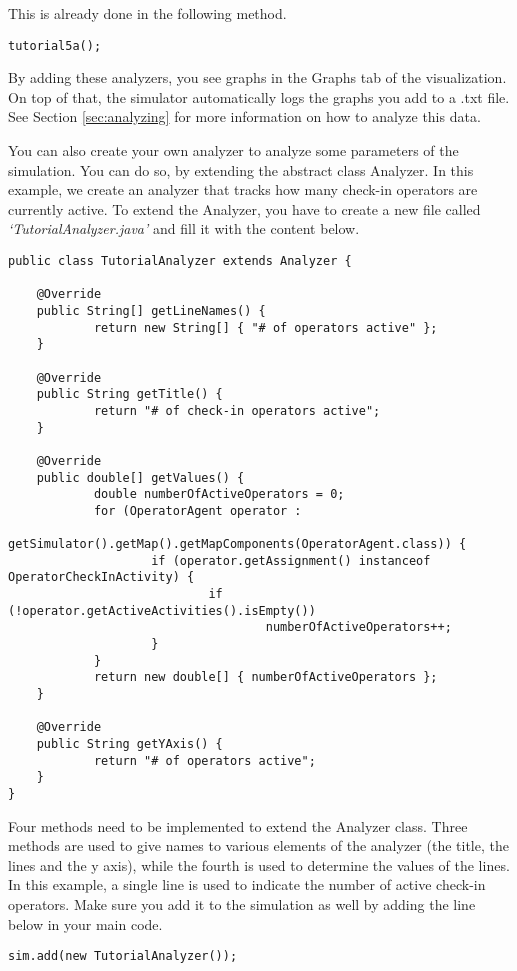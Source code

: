 \documentclass{article}
\begin{document}
This is already done in the following method.

\begin{verbatim}
tutorial5a();
\end{verbatim}

By adding these analyzers, you see graphs in the Graphs tab of the visualization. On top of that, the simulator automatically logs the graphs you add to a .txt file. See Section \ref{sec:analyzing} for more information on how to analyze this data.

You can also create your own analyzer to analyze some parameters of the simulation. You can do so, by extending the abstract class Analyzer. In this example, we create an analyzer that tracks how many check-in operators are currently active. To extend the Analyzer, you have to create a new file called \textit{`TutorialAnalyzer.java'} and fill it with the content below.

\begin{verbatim}
public class TutorialAnalyzer extends Analyzer {

	@Override
	public String[] getLineNames() {
	    	return new String[] { "# of operators active" };
	}

	@Override
	public String getTitle() {
	    	return "# of check-in operators active";
	}

	@Override
	public double[] getValues() {
    		double numberOfActiveOperators = 0;
    		for (OperatorAgent operator : 
    		getSimulator().getMap().getMapComponents(OperatorAgent.class)) {
    			    if (operator.getAssignment() instanceof OperatorCheckInActivity) {
    				        if (!operator.getActiveActivities().isEmpty())
    					            numberOfActiveOperators++;
    			    }
    		}
    		return new double[] { numberOfActiveOperators };
	}

	@Override
	public String getYAxis() {
		    return "# of operators active";
	}
}

\end{verbatim}
Four methods need to be implemented to extend the Analyzer class. Three methods are used to give names to various elements of the analyzer (the title, the lines and the y axis), while the fourth is used to determine the values of the lines. In this example, a single line is used to indicate the number of active check-in operators. Make sure you add it to the simulation as well by adding the line below in your main code.

\begin{verbatim}
sim.add(new TutorialAnalyzer());
\end{verbatim}
\end{document}
